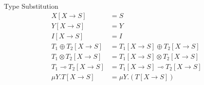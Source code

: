 \documentclass[10pt]{jsarticle}
\begin{document}
\begin{itembox}[c]{Type Substitution}
  \begin{align*}
    X[X \rightarrow S]                   &= S \\
    Y[X \rightarrow S]                   &= Y \\
    I[X \rightarrow S]                   &= I \\
    T_1\oplus{}T_2[X \rightarrow S]      &= T_1[X \rightarrow S]\oplus{}T_2[X \rightarrow S] \\
    T_1\otimes{}T_2[X \rightarrow S]     &= T_1[X \rightarrow S]\otimes{}T_2[X \rightarrow S] \\
    T_1\multimap{}T_2[X \rightarrow S]   &= T_1[X \rightarrow S]\multimap{}T_2[X \rightarrow S] \\
    \mu{Y}.T[X \rightarrow S]            &= \mu{Y}.(T[X \rightarrow S]) \\
  \end{align*}
\end{itembox}
\end{document}
